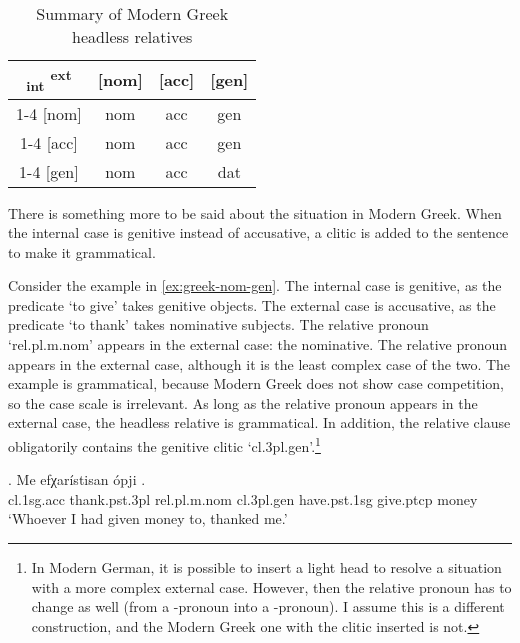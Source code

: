 \begin{table}[H]
  \center
  \caption{Summary of Modern Greek headless relatives}
  \begin{tabular}{c|c|c|c}
    \toprule
   \textsubscript{\ac{int}} \textsuperscript{\ac{ext}}
          & [\ac{nom}]
          & [\ac{acc}]
          & [\ac{gen}]
          \\ \cmidrule{1-4}
      [\ac{nom}]
          & \ac{nom}
          & \cellcolor{LG}\ac{acc}
          & \ac{gen}
          \\ \cmidrule{1-4}
      [\ac{acc}]
          & \cellcolor{DG}\ac{nom}
          & \ac{acc}
          & \ac{gen}
          \\ \cmidrule{1-4}
      [\ac{gen}]
          & \ac{nom}
          & \ac{acc}
          & \ac{dat}
          \\
    \bottomrule
  \end{tabular}
  \label{tbl:no-case-competition-greek}
\end{table}

There is something more to be said about the situation in Modern Greek. When the internal case is genitive instead of accusative, a clitic is added to the sentence to make it grammatical.

Consider the example in \ref{ex:greek-nom-gen}.
The internal case is genitive, as the predicate  `to give' takes genitive objects.
The external case is accusative, as the predicate  `to thank' takes nominative subjects.
The relative pronoun  `\ac{rel}.\ac{pl}.\ac{m}.\ac{nom}' appears in the external case: the nominative.
The relative pronoun appears in the external case, although it is the least complex case of the two. The example is grammatical, because Modern Greek does not show case competition, so the case scale is irrelevant. As long as the relative pronoun appears in the external case, the headless relative is grammatical. In addition, the relative clause obligatorily contains the genitive clitic  `\ac{cl}.3\ac{pl}.\ac{gen}'.\footnote{
In Modern German, it is possible to insert a light head to resolve a situation with a more complex external case. However, then the relative pronoun has to change as well (from a -pronoun into a -pronoun). I assume this is a different construction, and the Modern Greek one with the clitic inserted is not.
}

\exg. Me efχarístisan ópji    .\\
 \ac{cl}.1\ac{sg}.\ac{acc} thank.\ac{pst}.3\ac{pl}\scsub{[nom]} \ac{rel}.\ac{pl}.\ac{m}.\ac{nom} \ac{cl}.3\ac{pl}.\ac{gen} have.\ac{pst}.1\ac{sg} give.\ac{ptcp}\scsub{[gen]} money\\
 `Whoever I had given money to, thanked me.'\label{ex:greek-nom-gen}

